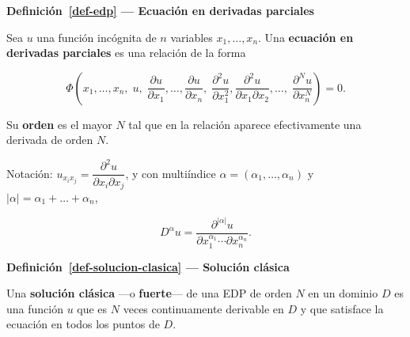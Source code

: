 \documentclass[
  spanish,
  a4paper,
]{scrbook}
\theoremstyle{definition}
\theoremstyle{plain}
\theoremstyle{definition}
\theoremstyle{plain}
\theoremstyle{definition}
\theoremstyle{remark}
\begin{document}
\begin{tcolorbox}[enhanced jigsaw, arc=.35mm, bottomrule=.15mm, breakable, colback=white, colframe=quarto-callout-note-color-frame, left=2mm, leftrule=.75mm, opacityback=0, rightrule=.15mm, toprule=.15mm]
\begin{minipage}[t]{5.5mm}
\textcolor{quarto-callout-note-color}{\faInfo}
\end{minipage}%
\begin{minipage}[t]{\textwidth - 5.5mm}

\vspace{-3mm}\textbf{Definición~\ref{def-edp} --- Ecuación en derivadas parciales}\vspace{3mm}

Sea \(u\) una función incógnita de \(n\) variables \(x_1,\dots,x_n\).
Una \textbf{ecuación en derivadas parciales} es una relación de la forma

\[
\Phi\!\left(x_1,\dots,x_n,\;u,\;\frac{\partial u}{\partial x_1},\dots,\frac{\partial u}{\partial x_n},\;
\frac{\partial^2 u}{\partial x_1^2},\frac{\partial^2 u}{\partial x_1\partial x_2},\dots,\;
\frac{\partial^N u}{\partial x_n^N}\right) = 0 .
\]

Su \textbf{orden} es el mayor \(N\) tal que en la relación aparece
efectivamente una derivada de orden \(N\).

\end{minipage}%
\end{tcolorbox}

Notación:
\(u_{x_ix_j} = \dfrac{\partial^2u}{\partial x_i\partial x_j}\), y con
multiíndice \(\alpha=(\alpha_1,\dots,\alpha_n)\) y
\(|\alpha| = \alpha_1+\dots+\alpha_n\),

\[
D^{\alpha}u = \frac{\partial^{|\alpha|} u}{\partial x_1^{\alpha_1}\cdots\partial x_n^{\alpha_n}} .
\]

\begin{tcolorbox}[enhanced jigsaw, arc=.35mm, bottomrule=.15mm, breakable, colback=white, colframe=quarto-callout-note-color-frame, left=2mm, leftrule=.75mm, opacityback=0, rightrule=.15mm, toprule=.15mm]
\begin{minipage}[t]{5.5mm}
\textcolor{quarto-callout-note-color}{\faInfo}
\end{minipage}%
\begin{minipage}[t]{\textwidth - 5.5mm}

\vspace{-3mm}\textbf{Definición~\ref{def-solucion-clasica} --- Solución clásica}\vspace{3mm}

Una \textbf{solución clásica} ---o \textbf{fuerte}--- de una EDP de
orden \(N\) en un dominio \(D\) es una función \(u\) que es \(N\) veces
continuamente derivable en \(D\) y que satisface la ecuación en todos
los puntos de \(D\).

\end{minipage}%
\end{tcolorbox}
\end{document}
